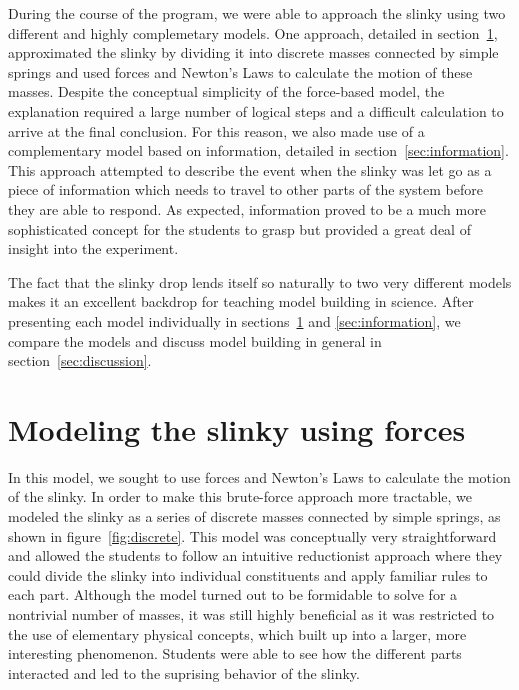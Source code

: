\documentclass[prb,preprint]{revtex4-1}
\renewcommand{\sec}[1]{section~\ref{sec:#1}}
\newcommand{\secs}[2]{sections~\ref{sec:#1} and \ref{sec:#2}}
\newcommand{\fig}[1]{figure~\ref{fig:#1}}
\begin{document}
During the course of the program, we were able to approach the slinky using two different
and highly complemetary models.
One approach, detailed in \sec{forces}, approximated
the slinky by dividing it into discrete masses connected by simple springs and used
forces and Newton's Laws to calculate the motion of these masses.
Despite the conceptual simplicity of the force-based model, the explanation
required a large number of logical steps and a difficult calculation to arrive at
the final conclusion. For this reason, we also made use of a complementary
model based on information, detailed in \sec{information}. This approach attempted
to describe the event when the slinky was let go as a piece of information which
needs to travel to other parts of the system before they are able to respond.
As expected, information proved to be a much more sophisticated concept for the
students to grasp but provided a great deal of insight into the experiment.

The fact that the slinky drop lends itself so naturally to two very different models
makes it an excellent backdrop for teaching model building in science. After presenting each
model individually in \secs{forces}{information}, we compare the models and
discuss model building in general in \sec{discussion}.

\section{Modeling the slinky using forces}
\label{sec:forces}

In this model, we sought to use forces and Newton's Laws to calculate the
motion of the slinky. In order to make this brute-force approach more tractable, we
modeled the slinky as a series of discrete masses connected by simple springs, as
shown in \fig{discrete}. This
model was conceptually very straightforward and allowed the students to follow an
intuitive reductionist approach where they could divide the slinky into individual
constituents and apply familiar rules to each part. Although the model turned out to
be formidable to solve for a nontrivial number of masses, it was still highly beneficial as it was restricted to the
use of elementary physical concepts, which built up into a larger, more interesting
phenomenon. Students were able to see how the different parts interacted and led
to the suprising behavior of the slinky.
\end{document}
